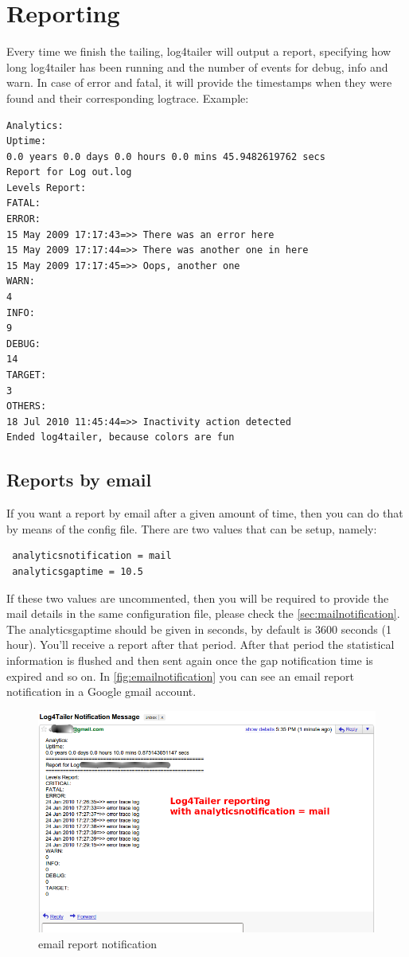 \section{Reporting}
Every time we finish the tailing, log4tailer will output a report, specifying how long 
log4tailer has been running and the number of events for debug, info and warn. In case of 
error and fatal, it will provide the timestamps when they were found and their corresponding logtrace.
Example:
\begin{verbatim}
Analytics: 
Uptime: 
0.0 years 0.0 days 0.0 hours 0.0 mins 45.9482619762 secs 
Report for Log out.log
Levels Report: 
FATAL:
ERROR:
15 May 2009 17:17:43=>> There was an error here
15 May 2009 17:17:44=>> There was another one in here
15 May 2009 17:17:45=>> Oops, another one
WARN:
4
INFO:
9
DEBUG:
14
TARGET:
3
OTHERS:
18 Jul 2010 11:45:44=>> Inactivity action detected
Ended log4tailer, because colors are fun
\end{verbatim}

\subsection{Reports by email}
If you want a report by email after a given amount of time, then you can do that by means 
of the config file. There are two values that can be setup, namely:
\begin{verbatim}
 analyticsnotification = mail
 analyticsgaptime = 10.5
\end{verbatim}
If these two values are uncommented, then you will be required to provide the mail 
details in the same configuration file, please check the \autoref{sec:mailnotification}. The analyticsgaptime should be given in seconds, by default is 3600 seconds (1 hour). 
You'll receive a report after that period. After that period the statistical information is 
flushed and then sent again once the gap notification time is expired and so on.
In \autoref{fig:emailnotification} %
you can see an email report notification in a Google gmail account.

\begin{figure}
\includegraphics[scale=0.50]{emailnotification.png}
\caption{\logftailer{} email report notification}\label{fig:emailnotification}
\end{figure}


